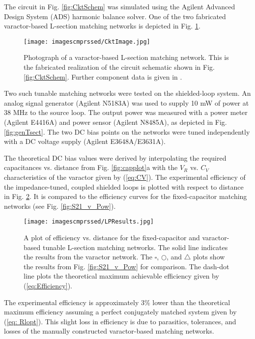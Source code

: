 \documentclass[journal]{IEEEtran}
\begin{document}
The circuit in Fig. \ref{fig:CktSchem} was simulated using the Agilent Advanced Design System (ADS) harmonic balance solver. One of the two fabricated varactor-based L-section matching networks is depicted in Fig. \ref{fig:CktImage}.
\begin{figure}[htbp]
    \centering
    \texttt{[image: imagescmprssed/CktImage.jpg]}
    \caption{Photograph of a varactor-based L-section matching network. This is the fabricated realization of the circuit schematic shown in Fig. \ref{fig:CktSchem}. Further component data is given in \cite{Components}.}
    \label{fig:CktImage}
\end{figure}
Two such tunable matching networks were tested on the shielded-loop system. An analog signal generator (Agilent N5183A) was used to supply 10 mW of power at 38 MHz to the source loop. The output power was measured with a power meter (Agilent E4416A) and power sensor (Agilent N8485A), as depicted in Fig. \ref{fig:genTsect}. The two DC bias points on the networks were tuned independently with a DC voltage supply (Agilent E3648A/E3631A).

The theoretical DC bias values were derived by interpolating the required capacitances vs. distance from Fig. \ref{fig:capplot}a with the $V_R$ vs. $C_V$ characteristics of the varactor given by (\ref{eq:CV}). The experimental efficiency of the impedance-tuned, coupled shielded loops is plotted with respect to distance in Fig. \ref{fig:LPResults}. It is compared to the efficiency curves for the fixed-capacitor matching networks (see Fig. \ref{fig:S21_v_Pow}).
\begin{figure}[htbp]
    \centering
    \texttt{[image: imagescmprssed/LPResults.jpg]}
    \caption{A plot of efficiency vs. distance for the fixed-capacitor and varactor-based tunable L-section matching networks. The solid line indicates the results from the varactor network. The $\square$, $\bigcirc$, and $\triangle$ plots show the results from Fig. \ref{fig:S21_v_Pow} for comparison. The dash-dot line plots the theoretical maximum achievable efficiency given by (\ref{eq:Efficiency}).}
    \label{fig:LPResults}
\end{figure}
The experimental efficiency is approximately $3\%$ lower than the theoretical maximum efficiency assuming a perfect conjugately matched system given by (\ref{eq: Rlopt}). This slight loss in efficiency is due to parasitics, tolerances, and losses of the manually constructed varactor-based matching networks.
\end{document}
